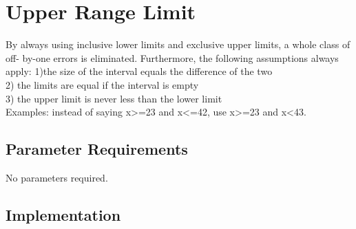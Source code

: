 %
%

\section{Upper Range Limit}
\label{UpperRangeLimit::overview}


By always using inclusive lower limits and exclusive upper
limits, a whole class of off-
by-one errors is eliminated. Furthermore, the following
assumptions always apply:
1)the size of the interval equals the
difference of the two  \\
2) the limits are equal if the interval is empty\\
3) the upper limit is never less than the lower limit\\

Examples: instead of saying x>=23 and x<=42, use x>=23 and
x<43.


\subsection{Parameter Requirements}

   No parameters required.
\subsection{Implementation}

